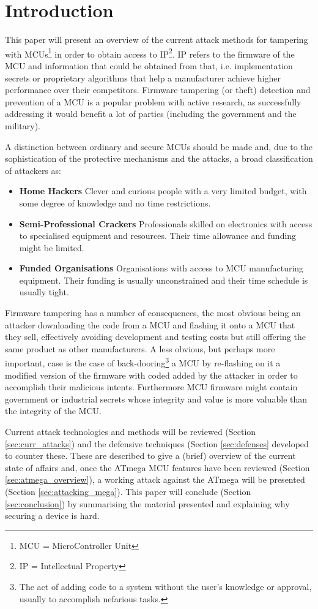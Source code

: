 \section{Introduction}
	This paper will present an overview of the current attack methods for tampering with MCUs\footnote{MCU = MicroController Unit} in order to obtain access to IP\footnote{IP = Intellectual Property}. IP refers to the firmware of the MCU and information that could be obtained from that, i.e. implementation secrets or proprietary algorithms that help a manufacturer achieve higher performance over their competitors. Firmware tampering (or theft) detection and prevention of a MCU is a popular problem with active research, as successfully addressing it would benefit a lot of parties (including the government and the military).
	
	A distinction between ordinary and secure MCUs should be made\citep{sergei:thesis} and, due to the sophistication of the protective mechanisms and the attacks, a broad classification of attackers as\cite{anderson:cautionary_note}:
		\begin{itemize}
			\item \textbf{Home Hackers} Clever and curious people with a very limited budget, with some degree of knowledge and no time restrictions.\\
			\item \textbf{Semi-Professional Crackers} Professionals skilled on electronics with access to specialised equipment and resources. Their time allowance and funding might be limited.\\
			\item \textbf{Funded Organisations} Organisations with access to MCU manufacturing equipment. Their funding is usually unconstrained and their time schedule is usually tight.
		\end{itemize}
	
	Firmware tampering has a number of consequences, the most obvious being an attacker downloading the code from a MCU and flashing it onto a MCU that they sell, effectively avoiding development and testing costs but still offering the same product as other manufacturers\cite{tech:aes_bls}. A less obvious, but perhaps more important, case is the case of back-dooring\footnote{The act of adding code to a system without the user's knowledge or approval, usually to accomplish nefarious tasks.} a MCU by re-flashing on it a modified version of the firmware with coded added by the attacker in order to accomplish their malicious intents. Furthermore MCU firmware might contain government or industrial secrets whose integrity and value is more valuable than the integrity of the MCU.
	
	Current attack technologies and methods will be reviewed (Section \ref{sec:curr_attacks}) and the defensive techniques (Section \ref{sec:defenses} developed to counter these. These are described to give a (brief) overview of the current state of affairs and, once the ATmega MCU features have been reviewed (Section \ref{sec:atmega_overview}), a working attack against the ATmega will be presented (Section \ref{sec:attacking_mega}). This paper will conclude (Section \ref{sec:conclusion}) by summarising the material presented and explaining why securing a device is hard. 
